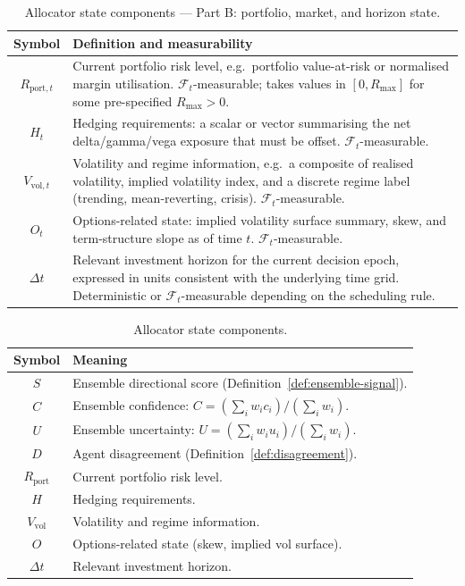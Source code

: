\documentclass[12pt,openany]{book}
\numberwithin{equation}{chapter}
\theoremstyle{plain}
\theoremstyle{definition}
\theoremstyle{remark}
\numberwithin{equation}{chapter}
\theoremstyle{plain}
\begin{document}
\begin{table}[H]
\centering
\caption{Allocator state components --- Part B: portfolio,
         market, and horizon state.}
\label{tab:allocator-state-B}
\small
\begin{tabularx}{\linewidth}{@{} c X @{}}
\toprule
\textbf{Symbol} & \textbf{Definition and measurability} \\
\midrule
$R_{\mathrm{port},t}$ &
  Current portfolio risk level, e.g.\ portfolio value-at-risk
  or normalised margin utilisation.
  $\mathcal{F}_t$-measurable; takes values in
  $[0, R_{\max}]$ for some pre-specified $R_{\max} > 0$. \\[4pt]
$H_t$ &
  Hedging requirements: a scalar or vector summarising the
  net delta/gamma/vega exposure that must be offset.
  $\mathcal{F}_t$-measurable. \\[4pt]
$V_{\mathrm{vol},t}$ &
  Volatility and regime information, e.g.\ a composite of
  realised volatility, implied volatility index, and a
  discrete regime label (trending, mean-reverting, crisis).
  $\mathcal{F}_t$-measurable. \\[4pt]
$O_t$ &
  Options-related state: implied volatility surface summary,
  skew, and term-structure slope as of time $t$.
  $\mathcal{F}_t$-measurable. \\[4pt]
$\Delta t$ &
  Relevant investment horizon for the current decision
  epoch, expressed in units consistent with the underlying
  time grid.
  Deterministic or $\mathcal{F}_t$-measurable depending on
  the scheduling rule. \\
\bottomrule
\end{tabularx}
\end{table}

\begin{table}[H]
\centering
\caption{Allocator state components.}
\label{tab:allocator-state-components}
\small
\begin{tabularx}{\linewidth}{@{} c X @{}}
\toprule
\textbf{Symbol} & \textbf{Meaning} \\
\midrule
$S$ & Ensemble directional score (Definition~\ref{def:ensemble-signal}). \\
$C$ & Ensemble confidence: $C = (\sum_i w_i c_i)/(\sum_i w_i)$. \\
$U$ & Ensemble uncertainty: $U = (\sum_i w_i u_i)/(\sum_i w_i)$. \\
$D$ & Agent disagreement (Definition~\ref{def:disagreement}). \\
$R_{\mathrm{port}}$ & Current portfolio risk level. \\
$H$ & Hedging requirements. \\
$V_{\mathrm{vol}}$ & Volatility and regime information. \\
$O$ & Options-related state (skew, implied vol surface). \\
$\Delta t$ & Relevant investment horizon. \\
\bottomrule
\end{tabularx}
\end{table}
\end{document}
